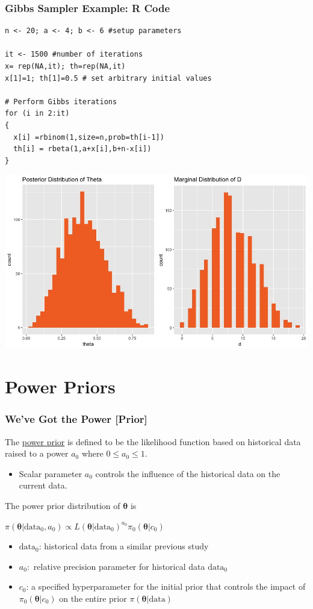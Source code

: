 \documentclass{beamer}
\begin{document}
\begin{frame}[fragile]
\frametitle{Gibbs Sampler Example: R Code}
\begin{verbatim}
n <- 20; a <- 4; b <- 6 #setup parameters

it <- 1500 #number of iterations
x= rep(NA,it); th=rep(NA,it) 
x[1]=1; th[1]=0.5 # set arbitrary initial values

# Perform Gibbs iterations
for (i in 2:it)
{
  x[i] =rbinom(1,size=n,prob=th[i-1])
  th[i] = rbeta(1,a+x[i],b+n-x[i])
}
\end{verbatim}
\end{frame}

\begin{frame}
\begin{center}
\includegraphics[scale=0.35]{Rplot.jpeg}
\end{center}
\end{frame}

\section{Power Priors}
\begin{frame}
\frametitle{We've Got the Power [Prior]}
The \underline{power prior} is defined to be the likelihood function based on historical data raised to a power $a_{0}$ where $0 \leq a_0 \leq 1$. 
\begin{itemize}
\item Scalar parameter $a_0$ controls the influence of the historical data on the current data.  
\end{itemize}
The power prior distribution of $\pmb{\theta}$ is 
\begin{center}
$\pi(\pmb{\theta}|\text{data}_0, a_0) \propto L(\pmb{\theta}|\text{data}_0)^{a_0}\pi_0(\pmb{\theta}|c_{0})$
\end{center}
\begin{itemize}
\item $\text{data}_0$: historical data from a similar previous study 
\item $a_0:$ relative precision parameter for historical data $\text{data}_0$
\item $c_0$: a specified hyperparameter for the initial prior that controls the impact of $\pi_0(\pmb{\theta}|c_{0})$ on the entire prior $\pi(\pmb{\theta}|\text{data})$
\end{itemize}
\end{frame}
\end{document}
